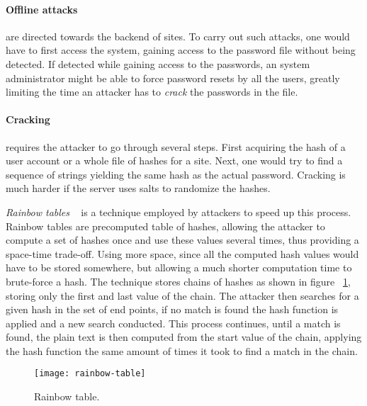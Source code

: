 \paragraph{Offline attacks} are directed towards the backend of sites. To carry out such attacks, one would have to first access the system, gaining access to the password file without being detected. If detected while gaining access to the passwords, an system administrator might be able to force password resets by all the users, greatly limiting the time an attacker has to \emph{crack} the passwords in the file.

\paragraph{Cracking} requires the attacker to go through several steps. First acquiring the hash of a user account or a whole file of hashes for a site. Next, one would try to find a sequence of strings yielding the same hash as the actual password. Cracking is much harder if the server uses salts to randomize the hashes.
\par \emph{ Rainbow tables }~\cite{rainbow-tables} is a technique employed by attackers to speed up this process. Rainbow tables are precomputed table of hashes, allowing the attacker to compute a set of hashes once and use these values several times, thus providing a space-time trade-off. Using more space, since all the computed hash values would have to be stored somewhere, but allowing a much shorter computation time to brute-force a hash. The technique stores chains of hashes as shown in figure ~\ref{rainbow-table}, storing only the first and last value of the chain. The attacker then searches for a given hash in the set of end points, if no match is found the hash function is applied and a new search conducted. This process continues, until a match is found, the plain text is then computed from the start value of the chain, applying the hash function the same amount of times it took to find a match in the chain. 

\begin{figure}[ht]
    \texttt{[image: rainbow-table]}
    \caption{Rainbow table.}
    \label{rainbow-table}
\end{figure}


